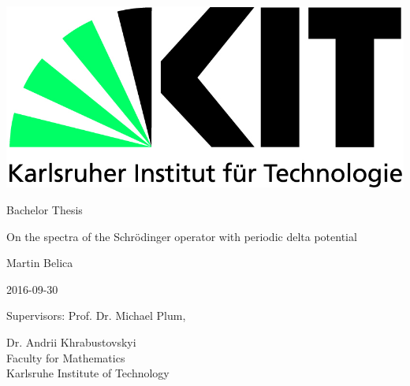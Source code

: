 \begin{titlepage}
  \includegraphics[scale=0.45]{kit-logo.jpg}
  \vspace*{2cm} 

  \begin{center} \large 
    
    Bachelor Thesis
    \vspace*{1.75cm}

    {\huge On the spectra of the Schrödinger operator with periodic delta potential}
    \vspace*{2.75cm}

    Martin Belica
    \vspace*{0.125cm}

    2016-09-30
    \vspace*{4.5cm}


    Supervisors: Prof. Dr. Michael Plum,
    \vspace*{0.125cm}
    
    Dr. Andrii Khrabustovskyi \\[1cm]
    Faculty for Mathematics \\[1cm]
	Karlsruhe Institute of Technology
  \end{center}
\end{titlepage}